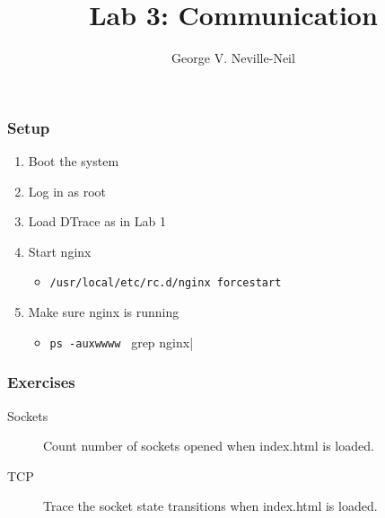 \documentclass[pdftex]{beamer}
\begin{document}

\title{Lab 3: Communication}
\author[shortname]{George V. Neville-Neil}

\begin{frame}[fragile]
  \frametitle{Setup}
  \begin{enumerate}
  \item Boot the system
  \item Log in as root
  \item Load DTrace as in Lab 1
  \item Start nginx
    \begin{itemize}
    \item \verb|/usr/local/etc/rc.d/nginx forcestart|
    \end{itemize}
  \item Make sure nginx is running
    \begin{itemize}
    \item \verb|ps -auxwwww | grep nginx|
    \end{itemize}
  \end{enumerate}
\end{frame}

\begin{frame}[fragile]
  \frametitle{Exercises}
  \begin{description}
  \item [Sockets] Count number of sockets opened when index.html is loaded.
  \item [TCP] Trace the socket state transitions when index.html is loaded.
  \end{description}
\end{frame}
\end{document}
